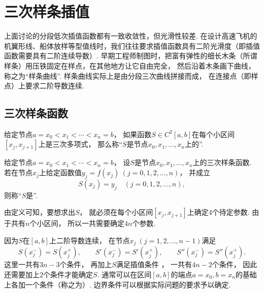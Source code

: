 \section{三次样条插值}
上面讨论的分段低次插值函数都有一致收敛性，但光滑性较差.
在设计高速飞机的机翼形线、船体放样等型值线时，我们往往要求插值函数具有二阶光滑度（即插值函数需要具有二阶连续导数）.
早期工程师制图时，把富有弹性的细长木条（所谓样条）用压铁固定在样点，在其他地方让它自由完全，
然后沿着木条画下曲线，称之为“样条曲线”.
样条曲线实际上是由分段三次曲线拼接而成，
在连接点（即样点）上要求二阶导数连续.

\subsection{三次样条函数}
\begin{definition}
给定节点\(a = x_0 < x_1 < \dotsb < x_n = b\)，
如果函数\(S \in C^2[a,b]\)在每个小区间\([x_j,x_{j+1}]\)上是三次多项式，
那么称“\(S\)是节点\(x_0,x_1,\dotsc,x_n\)上的”.
\end{definition}

\begin{definition}
给定节点\(a = x_0 < x_1 < \dotsb < x_n = b\)，
设\(S\)是节点\(x_0,x_1,\dotsc,x_n\)上的三次样条函数.
若在节点\(x_j\)上给定函数值\(y_j = f(x_j)\ (j=0,1,2,\dotsc,n)\)，
并成立\begin{equation}\label{equation:三次样条插值.插值条件}
	S(x_j) = y_j
	\quad(j=0,1,2,\dotsc,n),
\end{equation}
则称“\(S\)是”.
\end{definition}

由定义可知，要想求出\(S\)，
就必须在每个小区间\([x_j,x_{j+1}]\)上确定4个待定参数.
由于共有\(n\)个小区间，
所以一共需要确定\(4n\)个参数.

因为\(S\)在\([a,b]\)上二阶导数连续，
在节点\(x_j\ (j=1,2,\dotsc,n-1)\)满足\begin{equation}\label{equation:三次样条插值.中间条件}
	S(x_j^-) = S(x_j^+),
	\qquad
	S'(x_j^-) = S'(x_j^+),
	\qquad
	S''(x_j^-) = S''(x_j^+).
\end{equation}
这里一共有\(3n-3\)个条件，
再加上\(S\)满足插值条件 ，
一共有\(4n-2\)个条件，
因此还需要加上2个条件才能确定\(S\).
通常可以在区间\([a,b]\)的端点\(a = x_0, b = x_n\)的基础上各加一个条件（称之为）.
边界条件可以根据实际问题的要求予以确定.

